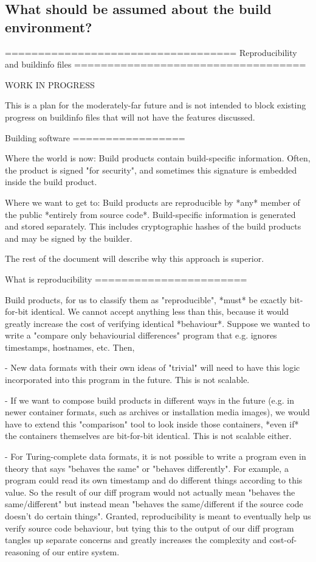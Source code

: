 \subsection{What should be assumed about the build environment?}


===================================
Reproducibility and buildinfo files
===================================

WORK IN PROGRESS

This is a plan for the moderately-far future and is not intended to block
existing progress on buildinfo files that will not have the features discussed.

Building software
=================

Where the world is now: Build products contain build-specific information.
Often, the product is signed "for security", and sometimes this signature is
embedded inside the build product.

Where we want to get to: Build products are reproducible by *any* member of the
public *entirely from source code*. Build-specific information is generated and
stored separately. This includes cryptographic hashes of the build products and
may be signed by the builder.

The rest of the document will describe why this approach is superior.

What is reproducibility
=======================

Build products, for us to classify them as "reproducible", *must* be exactly
bit-for-bit identical. We cannot accept anything less than this, because it
would greatly increase the cost of verifying identical *behaviour*. Suppose we
wanted to write a "compare only behaviourial differences" program that e.g.
ignores timestamps, hostnames, etc. Then,

- New data formats with their own ideas of "trivial" will need to have this
  logic incorporated into this program in the future. This is not scalable.

- If we want to compose build products in different ways in the future (e.g. in
  newer container formats, such as archives or installation media images), we
  would have to extend this "comparison" tool to look inside those containers,
  *even if* the containers themselves are bit-for-bit identical. This is not
  scalable either.

- For Turing-complete data formats, it is not possible to write a program even
  in theory that says "behaves the same" or "behaves differently". For example,
  a program could read its own timestamp and do different things according to
  this value. So the result of our diff program would not actually mean
  "behaves the same/different" but instead mean "behaves the same/different if
  the source code doesn't do certain things". Granted, reproducibility is meant
  to eventually help us verify source code behaviour, but tying this to the
  output of our diff program tangles up separate concerns and greatly increases
  the complexity and cost-of-reasoning of our entire system.

